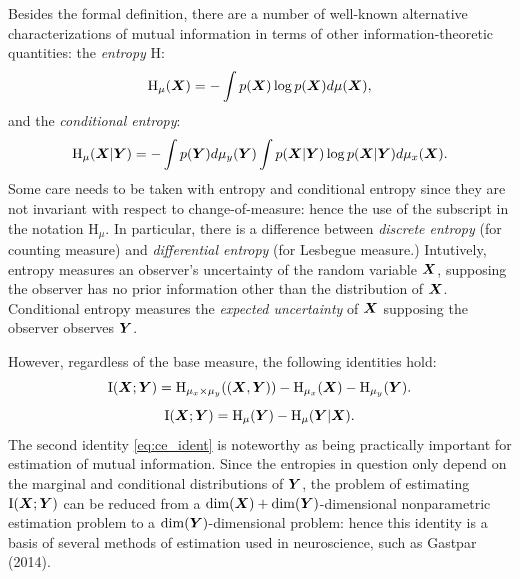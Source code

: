 \documentclass[12pt]{article}
\begin{document}
Besides the formal definition, there are a number of well-known alternative
characterizations of mutual information in terms of other
information-theoretic quantities: the \emph{entropy} $\text{H}$:
\[
\text{H}_\mu(\boldsymbol{X}) = -\int p(\boldsymbol{X}) \log p(\boldsymbol{X}) d\mu(\boldsymbol{X}),
\]
and the \emph{conditional entropy}:
\[
\text{H}_\mu(\boldsymbol{X}|\boldsymbol{Y}) = -\int p(\boldsymbol{Y}) d\mu_y(\boldsymbol{Y}) \int p(\boldsymbol{X}|\boldsymbol{Y}) \log p(\boldsymbol{X}|\boldsymbol{Y}) d\mu_x(\boldsymbol{X}).
\]
Some care needs to be taken with entropy and conditional entropy since
they are not invariant with respect to change-of-measure: hence the
use of the subscript in the notation $\text{H}_\mu$.  In particular,
there is a difference between \emph{discrete entropy} (for counting
measure) and \emph{differential entropy} (for Lesbegue measure.)
Intutively, entropy measures an observer's uncertainty of the random
variable $\boldsymbol{X}$, supposing the observer has no prior information other
than the distribution of $\boldsymbol{X}$. Conditional entropy measures
the \emph{expected uncertainty} of $\boldsymbol{X}$ supposing the observer
observes $\boldsymbol{Y}$.

However, regardless of the base measure, the following identities hold:
\[
\text{I}(\boldsymbol{X}; \boldsymbol{Y}) = \text{H}_{\mu_x \times \mu_y}((\boldsymbol{X}, \boldsymbol{Y})) - \text{H}_{\mu_x}(\boldsymbol{X}) - \text{H}_{\mu_y}(\boldsymbol{Y}).
\]
\begin{equation}\label{eq:ce_ident}
\text{I}(\boldsymbol{X}; \boldsymbol{Y}) = \text{H}_\mu(\boldsymbol{Y}) - \text{H}_\mu(\boldsymbol{Y}|\boldsymbol{X}).
\end{equation}
The second identity \eqref{eq:ce_ident} is noteworthy
as being practically important for estimation of mutual information.
Since the entropies in question only depend on the marginal and
conditional distributions of $\boldsymbol{Y}$, the problem of estimating
$\text{I}(\boldsymbol{X}; \boldsymbol{Y})$ can be reduced from a $\dim(\boldsymbol{X})
+ \dim(\boldsymbol{Y})$-dimensional nonparametric estimation problem to a
$\dim(\boldsymbol{Y})$-dimensional problem: hence this identity is a basis of
several methods of estimation used in neuroscience, such as Gastpar
(2014).
\end{document}
